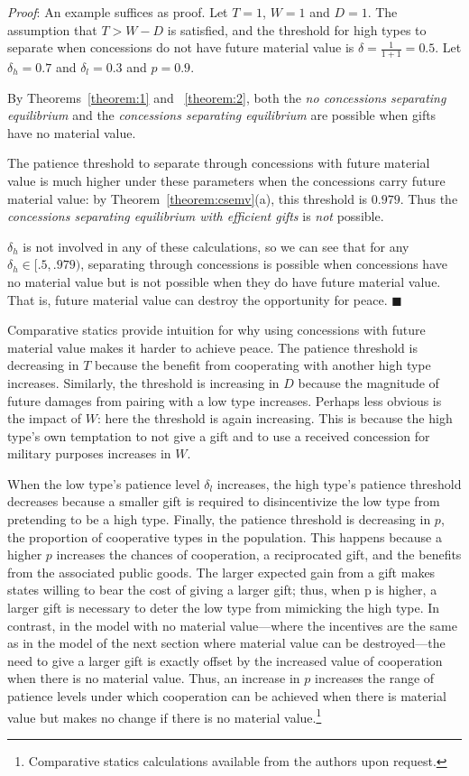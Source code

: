 \documentclass[12pt, letterpaper]{article}
\newcommand{\de}{\delta}
\begin{document}
\emph{Proof}: An example suffices as proof. Let $T = 1$, $W=1$ and $D = 1$. The assumption that $T > W - D$ is satisfied, and the threshold for high types to separate when concessions do not have future material value is $\de = \frac{1}{1+1} = 0.5$. Let $\de_h = 0.7$ and $\de_l = 0.3$ and $p = 0.9$.

By Theorems~\ref{theorem:1} and ~\ref{theorem:2}, both the \emph{no concessions separating equilibrium} and the \emph{concessions separating equilibrium} are possible when gifts have no material value.

The patience threshold to separate through concessions with future material value is much higher under these parameters when the concessions carry future material value: by Theorem~\ref{theorem:csemv}(a), this threshold is $0.979$. Thus the \emph{concessions separating equilibrium with efficient gifts} is \emph{not} possible. 

$\de_h$ is not involved in any of these calculations, so we can see that for any $\de_h \in [.5,.979)$, separating through concessions is possible when concessions have no material value but is not possible when they do have future material value. That is, future material value can destroy the opportunity for peace. \hfill $\blacksquare$ 

Comparative statics provide intuition for why using concessions with future material value makes it harder to achieve peace. The patience threshold is decreasing in $T$ because the benefit from cooperating with another high type increases. Similarly, the threshold is increasing in $D$ because the magnitude of future damages from pairing with a low type increases. Perhaps less obvious is the impact of $W$: here the threshold is again increasing. This is because the high type's own temptation to not give a gift and to use a received concession for military purposes increases in $W$.

When the low type's patience level $\de_l$ increases, the high type's patience threshold decreases because a smaller gift is required to disincentivize the low type from pretending to be a high type. Finally, the patience threshold is decreasing in $p$, the proportion of cooperative types in the population. This happens because a higher $p$ increases the chances of cooperation, a reciprocated gift, and the benefits from the associated public goods. The larger expected gain from a gift makes states willing to bear the cost of giving a larger gift; thus, when p is higher, a larger gift is necessary to deter the low type from mimicking the high type. In contrast, in the model with no material value---where the incentives are the same as in the model of the next section where material value can be destroyed---the need to give a larger gift is exactly offset by the increased value of cooperation when there is no material value. Thus, an increase in $p$ increases the range of patience levels under which cooperation can be achieved when there is material value but makes no change if there is no material value.\footnote{Comparative statics calculations available from the authors upon request.} 
\end{document}
